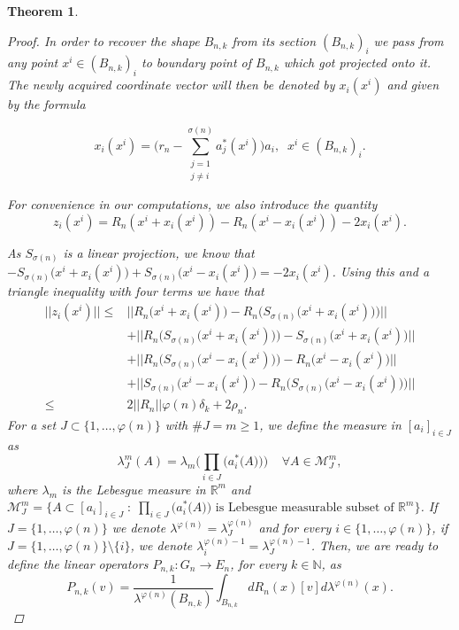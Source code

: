 \documentclass[11pt]{amsart}
\newcommand{\N}{\mathbb{N}}
\newcommand{\R}{\mathbb{R}}
\newcommand{\<}{\langle}
\renewcommand{\>}{\rangle}
\newtheorem{theorem}{Theorem}[section]
\theoremstyle{definition}
\theoremstyle{remark}
\numberwithin{equation}{section}
\def\R{{\mathbb R}}
\begin{document}
\begin{theorem}
\begin{proof}
In order to recover the shape $B_{n,k}$ from its section $(B_{n,k})_i$ we pass from any point  $x^i\in (B_{n,k})_i$ to boundary point of $B_{n,k}$ which got projected onto it. The newly acquired coordinate vector will then be denoted by $x_i(x^i)$ and 
given by the formula

$$x_i(x^i)=\bigg( r_n-\sum\limits_{\substack{j=1\\j\neq i}}^{\sigma(n)}a_j^*(x^i) \bigg)a_i,\;\; x^i\in (B_{n,k})_i.$$

For convenience in our computations, we also introduce the quantity
$$z_i(x^i)=R_n(x^i+x_i(x^i))-R_n(x^i-x_i(x^i))-2x_i(x^i).$$

As $S_{\sigma(n)}$ is a linear projection, we know that
$-S_{\sigma(n)}\big(x^i+x_i(x^i)\big)+S_{\sigma(n)}\big(x^i-x_i(x^i)\big)=-2x_i(x^i)$. Using this and a triangle inequality with four terms 
we have that
$$\begin{aligned}||z_i(x^i)||\le&\big|\big|R_n\big(x^i+x_i(x^i)\big)-R_n\big(S_{\sigma(n)}\big(x^i+x_i(x^i)\big)\big)\big|\big|\\&+\big|\big|R_n\big(S_{\sigma(n)}\big(x^i+x_i(x^i)\big)\big)-S_{\sigma(n)}\big(x^i+x_i(x^i)\big)\big|\big|\\&+\big|\big|R_n\big(S_{\sigma(n)}\big(x^i-x_i(x^i)\big)\big)-R_n\big(x^i-x_i(x^i)\big)\big|\big|\\&+\big|\big|S_{\sigma(n)}\big(x^i-x_i(x^i)\big)-R_n\big(S_{\sigma(n)}\big(x^i-x_i(x^i)\big)\big)\big|\big|\\\le&2||R_n||\varphi(n)\delta_k+2\rho_n.\end{aligned}$$
For a set $J\subset \{1,\dots,\varphi(n)\}$ with $\# J=m\ge1$, we define the measure in $[a_i]_{i\in J}$ as 
$$\lambda^m_J(A)=\lambda_m\bigg(\prod\limits_{i\in J}\Big( a_i^*\big(A\big)\Big)\bigg)\;\;\;\;\forall A\in \mathcal{M}^m_J, $$
where $\lambda_m$ is the Lebesgue measure in $\R^m$ and $\mathcal{M}^m_J=\bigg\{A\subset [a_i]_{i\in J}\;:\;\prod\limits_{i\in J}\Big( a_i^*\big(A\big)\Big) \text{ is Lebesgue measurable subset of }\R^m\bigg\}$. If $J=\{1,\dots,\varphi(n)\}$ we denote $\lambda^{\varphi(n)}=\lambda^{\varphi(n)}_J$ and for every $i\in\{1,\dots,\varphi(n)\}$, if $J=\{1,\dots,\varphi(n)\}\setminus\{i\}$, we denote $\lambda^{\varphi(n)-1}_i=\lambda^{\varphi(n)-1}_{J}$.
Then, we are ready to define  the linear operators $P_{n,k}:G_n\rightarrow E_n$, for every $k\in\N$, as
$$P_{n,k}(v)=\frac{1}{\lambda^{\varphi(n)}(B_{n,k})}\int_{B_{n,k}}dR_n(x)[v]d\lambda^{\varphi(n)}(x).$$


\end{proof}
\end{theorem}
\end{document}
